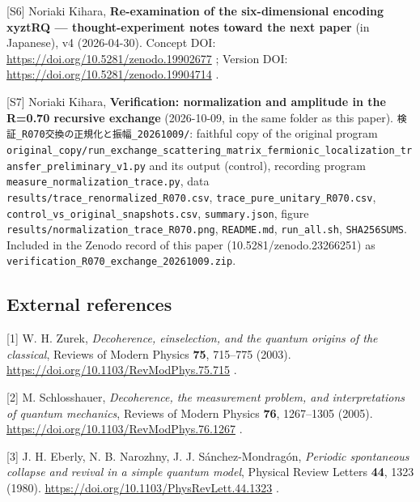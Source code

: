 \documentclass[
  a4paper,
]{article}
\begin{document}
{[}S6{]} Noriaki Kihara, \textbf{Re-examination of the six-dimensional
encoding xyztRQ --- thought-experiment notes toward the next paper} (in
Japanese), v4 (2026-04-30). Concept DOI:
\url{https://doi.org/10.5281/zenodo.19902677} ; Version DOI:
\url{https://doi.org/10.5281/zenodo.19904714} .

{[}S7{]} Noriaki Kihara, \textbf{Verification: normalization and
amplitude in the R=0.70 recursive exchange} (2026-10-09, in the same
folder as this paper). \texttt{検証\_\allowbreak{}R070交換の正規化と振幅\_\allowbreak{}20261009/\allowbreak{}}:
faithful copy of the original program
\texttt{original\_\allowbreak{}copy/\allowbreak{}run\_\allowbreak{}exchange\_\allowbreak{}scattering\_\allowbreak{}matrix\_\allowbreak{}fermionic\_\allowbreak{}localization\_\allowbreak{}transfer\_\allowbreak{}preliminary\_\allowbreak{}v1.py}
and its output (control), recording program
\texttt{measure\_\allowbreak{}normalization\_\allowbreak{}trace.py}, data
\texttt{results/\allowbreak{}trace\_\allowbreak{}renormalized\_\allowbreak{}R070.csv},
\texttt{trace\_\allowbreak{}pure\_\allowbreak{}unitary\_\allowbreak{}R070.csv},
\texttt{control\_\allowbreak{}vs\_\allowbreak{}original\_\allowbreak{}snapshots.csv}, \texttt{summary.json},
figure \texttt{results/\allowbreak{}normalization\_\allowbreak{}trace\_\allowbreak{}R070.png},
\texttt{README.md}, \texttt{run\_\allowbreak{}all.sh}, \texttt{SHA256SUMS}. Included
in the Zenodo record of this paper (10.5281/zenodo.23266251) as
\texttt{verification\_\allowbreak{}R070\_\allowbreak{}exchange\_\allowbreak{}20261009.zip}.

\subsection{External references}\label{external-references}

{[}1{]} W. H. Zurek, \emph{Decoherence, einselection, and the quantum
origins of the classical}, Reviews of Modern Physics \textbf{75},
715--775 (2003). \url{https://doi.org/10.1103/RevModPhys.75.715} .

{[}2{]} M. Schlosshauer, \emph{Decoherence, the measurement problem, and
interpretations of quantum mechanics}, Reviews of Modern Physics
\textbf{76}, 1267--1305 (2005).
\url{https://doi.org/10.1103/RevModPhys.76.1267} .

{[}3{]} J. H. Eberly, N. B. Narozhny, J. J. Sánchez-Mondragón,
\emph{Periodic spontaneous collapse and revival in a simple quantum
model}, Physical Review Letters \textbf{44}, 1323 (1980).
\url{https://doi.org/10.1103/PhysRevLett.44.1323} .
\end{document}

